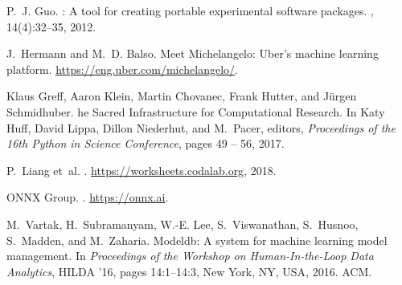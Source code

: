 \documentclass[11pt]{article}
\begin{document}
{\begin{thebibliography}{10}
  P.~J. Guo.
  : A tool for creating portable experimental software packages.
  , 14(4):32--35, 2012.

  J.~Hermann and M.~D. Balso.
  \newblock Meet {Michelangelo}: Uber’s machine learning platform.
  \newblock \url{https://eng.uber.com/michelangelo/}.

  {K}laus {G}reff, {A}aron {K}lein, {M}artin {C}hovanec, {F}rank {H}utter, and
    {J}\"urgen {S}chmidhuber.
  he {S}acred {I}nfrastructure for {C}omputational {R}esearch.
  \newblock In {K}aty {H}uff, {D}avid {L}ippa, {D}illon {N}iederhut, and
    M.~{P}acer, editors, {\em {P}roceedings of the 16th {P}ython in {S}cience
    {C}onference}, pages 49 -- 56, 2017.

  P.~Liang et~al.
  .
  \newblock \url{https://worksheets.codalab.org}, 2018.

  {ONNX Group}.
  .
  \newblock \url{https://onnx.ai}.

  M.~Vartak, H.~Subramanyam, W.-E. Lee, S.~Viswanathan, S.~Husnoo, S.~Madden, and
    M.~Zaharia.
  \newblock Modeldb: A system for machine learning model management.
  \newblock In {\em Proceedings of the Workshop on Human-In-the-Loop Data
    Analytics}, HILDA '16, pages 14:1--14:3, New York, NY, USA, 2016. ACM.

  \end{thebibliography}


}
%
%
\end{document}
